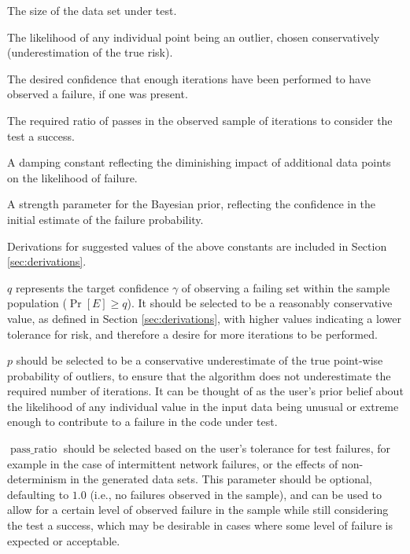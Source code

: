 \begin{description}[labelwidth=2em, leftmargin=!]
    \item[$n$] The size of the data set under test.
    \item[$p$] The likelihood of any individual point being an outlier, chosen conservatively (underestimation of the true risk).
    \item[$q$] The desired confidence that enough iterations have been performed to have observed a failure, if one was present.
    \item[$\operatorname{pass\_ratio}$] The required ratio of passes in the observed sample of iterations to consider the test a success.
\end{description}

\begin{description}[labelwidth=5em, leftmargin=!]
    \item[$C$] A damping constant reflecting the diminishing impact of additional data points on the likelihood of failure.
    \item[$p_s$] A strength parameter for the Bayesian prior, reflecting the confidence in the initial estimate of the failure probability.
\end{description}

Derivations for suggested values of the above constants are included in Section \ref{sec:derivations}.

$q$ represents the target confidence $\gamma$ of observing a failing set within the sample population ($\Pr[E] \ge q$). It should be selected to be a reasonably conservative value, as defined in Section \ref{sec:derivations}, with higher values indicating a lower tolerance for risk, and therefore a desire for more iterations to be performed.

$p$ should be selected to be a conservative underestimate of the true point-wise probability of outliers, to ensure that the algorithm does not underestimate the required number of iterations. It can be thought of as the user's prior belief about the likelihood of any individual value in the input data being unusual or extreme enough to contribute to a failure in the code under test. 

$\operatorname{pass\_ratio}$ should be selected based on the user's tolerance for test failures, for example in the case of intermittent network failures, or the effects of non-determinism in the generated data sets. This parameter should be optional, defaulting to $1.0$ (i.e., no failures observed in the sample), and can be used to allow for a certain level of observed failure in the sample while still considering the test a success, which may be desirable in cases where some level of failure is expected or acceptable.

